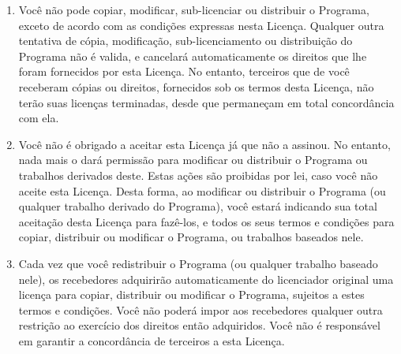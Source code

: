 {\begin{enumerate}
O código-fonte de um trabalho corresponde à forma de trabalho
preferida para se fazer modificações. Para um trabalho em forma
executável, o código-fonte completo significa todo o código-fonte de
todos os módulos que ele contém, mais quaisquer arquivos de definição
de "interface", mais os "scripts" utilizados para se controlar a
compilação e a instalação do executável. Contudo, como exceção
especial, o código-fonte distribuído não precisa incluir qualquer
componente normalmente distribuído (tanto em forma original quanto
binária) com os maiores componentes (o compilador, o "kernel" etc.) do
sistema operacional sob o qual o executável funciona, a menos que o
componente em si acompanhe o executável.

Se a distribuição do executável ou código-objeto é feita através da
oferta de acesso a cópias de algum lugar, então ofertar o acesso
equivalente a cópia, do mesmo lugar, do código-fonte equivale à
distribuição do código-fonte, mesmo que terceiros não sejam compelidos
a copiar o código-fonte com o código-objeto.

\item Você não pode copiar, modificar, sub-licenciar ou distribuir o
Programa, exceto de acordo com as condições expressas nesta
Licença. Qualquer outra tentativa de cópia, modificação,
sub-licenciamento ou distribuição do Programa não é valida, e
cancelará automaticamente os direitos que lhe foram fornecidos por
esta Licença. No entanto, terceiros que de você receberam cópias ou
direitos, fornecidos sob os termos desta Licença, não terão suas
licenças terminadas, desde que permaneçam em total concordância com
ela.

\item Você não é obrigado a aceitar esta Licença já que não a
assinou. No entanto, nada mais o dará permissão para modificar ou
distribuir o Programa ou trabalhos derivados deste. Estas ações são
proibidas por lei, caso você não aceite esta Licença. Desta forma, ao
modificar ou distribuir o Programa (ou qualquer trabalho derivado do
Programa), você estará indicando sua total aceitação desta Licença
para fazê-los, e todos os seus termos e condições para copiar,
distribuir ou modificar o Programa, ou trabalhos baseados nele.

\item Cada vez que você redistribuir o Programa (ou qualquer trabalho
baseado nele), os recebedores adquirirão automaticamente do
licenciador original uma licença para copiar, distribuir ou modificar
o Programa, sujeitos a estes termos e condições. Você não poderá impor
aos recebedores qualquer outra restrição ao exercício dos direitos
então adquiridos. Você não é responsável em garantir a concordância de
terceiros a esta Licença.


\end{enumerate}}
